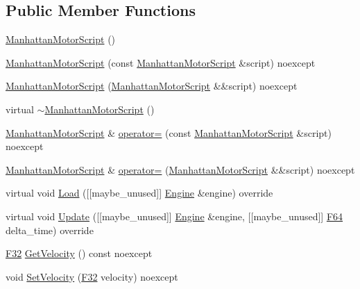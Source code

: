 \subsection*{Public Member Functions}
\begin{DoxyCompactItemize}
\item 
\hyperlink{classmage_1_1script_1_1_manhattan_motor_script_a042ae1a4a53d27c75ff85d5728ac3289}{Manhattan\+Motor\+Script} ()
\item 
\hyperlink{classmage_1_1script_1_1_manhattan_motor_script_a5c3bc9b400243333b661e4fd0e6e74b6}{Manhattan\+Motor\+Script} (const \hyperlink{classmage_1_1script_1_1_manhattan_motor_script}{Manhattan\+Motor\+Script} \&script) noexcept
\item 
\hyperlink{classmage_1_1script_1_1_manhattan_motor_script_a62843ba8d660b496bec036082a0867f6}{Manhattan\+Motor\+Script} (\hyperlink{classmage_1_1script_1_1_manhattan_motor_script}{Manhattan\+Motor\+Script} \&\&script) noexcept
\item 
virtual \hyperlink{classmage_1_1script_1_1_manhattan_motor_script_aca76d9d5be76b048ec247e93e4a89adb}{$\sim$\+Manhattan\+Motor\+Script} ()
\item 
\hyperlink{classmage_1_1script_1_1_manhattan_motor_script}{Manhattan\+Motor\+Script} \& \hyperlink{classmage_1_1script_1_1_manhattan_motor_script_a1c4dc4ffae903942248c7f744b0d019f}{operator=} (const \hyperlink{classmage_1_1script_1_1_manhattan_motor_script}{Manhattan\+Motor\+Script} \&script) noexcept
\item 
\hyperlink{classmage_1_1script_1_1_manhattan_motor_script}{Manhattan\+Motor\+Script} \& \hyperlink{classmage_1_1script_1_1_manhattan_motor_script_a3184ea5b921fbdbd81173db3f7042a0c}{operator=} (\hyperlink{classmage_1_1script_1_1_manhattan_motor_script}{Manhattan\+Motor\+Script} \&\&script) noexcept
\item 
virtual void \hyperlink{classmage_1_1script_1_1_manhattan_motor_script_ac93b09e8f82932f7071b1f591a8004e9}{Load} (\mbox{[}\mbox{[}maybe\+\_\+unused\mbox{]}\mbox{]} \hyperlink{classmage_1_1_engine}{Engine} \&engine) override
\item 
virtual void \hyperlink{classmage_1_1script_1_1_manhattan_motor_script_a217112de68b2dd1ad4fb9cbebb0537f0}{Update} (\mbox{[}\mbox{[}maybe\+\_\+unused\mbox{]}\mbox{]} \hyperlink{classmage_1_1_engine}{Engine} \&engine, \mbox{[}\mbox{[}maybe\+\_\+unused\mbox{]}\mbox{]} \hyperlink{namespacemage_ad26233bbec640deda836e572c1a23708}{F64} delta\+\_\+time) override
\item 
\hyperlink{namespacemage_aa97e833b45f06d60a0a9c4fc22ae02c0}{F32} \hyperlink{classmage_1_1script_1_1_manhattan_motor_script_a2f73545bf2fb507375251d530054ac9b}{Get\+Velocity} () const noexcept
\item 
void \hyperlink{classmage_1_1script_1_1_manhattan_motor_script_acf4db52ae6b0c9f97c0b7e719acea6bc}{Set\+Velocity} (\hyperlink{namespacemage_aa97e833b45f06d60a0a9c4fc22ae02c0}{F32} velocity) noexcept
\end{DoxyCompactItemize}
